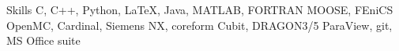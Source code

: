 
\begin{rubric}{Skills}
  C, C++, Python, \LaTeX, Java, MATLAB, FORTRAN
\entry*[Frameworks]
  MOOSE, FEniCS
\entry*[Tools]
  OpenMC, Cardinal, Siemens NX, coreform Cubit, DRAGON3/5
\entry*[Miscellaneous]
  ParaView, git, MS Office suite
\end{rubric}
